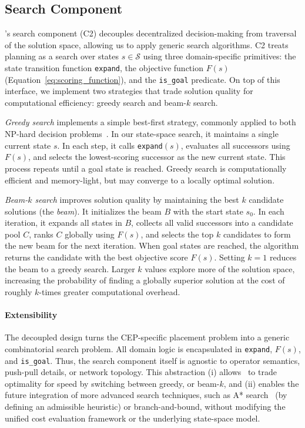 \subsection{Search Component}\label{sec:search}
%
\we's search component (C2) decouples decentralized decision-making from traversal of the solution space, allowing us to apply generic search algorithms.
%
C2 treats planning as a search over states $s \in \mathcal{S}$ using three domain-specific primitives: the state transition function \texttt{expand}, the objective function $F(s)$ (Equation~\ref{eq:scoring_function}), and the \texttt{is\_goal} predicate.
%
On top of this interface, we implement two strategies that trade solution quality for computational efficiency: greedy search and beam-$k$ search.

\textit{Greedy search}
%
implements a simple best-first strategy, commonly applied to both NP-hard decision problems~\cite{PushPullSamira,DBLP:journals/pacmmod/AkiliP023}.
%
In our state-space search, it maintains a single current state $s$.
%
In each step, it calls \texttt{expand}$(s)$, evaluates all successors using $F(s)$, and selects the lowest-scoring successor as the new current state.
%
This process repeats until a goal state is reached.
%
Greedy search is computationally efficient and memory-light, but may converge to a locally optimal solution.

\textit{Beam-$k$ search} improves solution quality by maintaining the best $k$ candidate solutions (the \emph{beam}). It initializes the beam $B$ with the start state $s_0$.
%
In each iteration, it expands all states in $B$, collects all valid successors into a candidate pool $C$, ranks $C$ globally using $F(s)$, and selects the top $k$ candidates to form the new beam for the next iteration.
%
When goal states are reached, the algorithm returns the candidate with the best objective score $F(s)$.
%
Setting $k=1$ reduces the beam to a greedy search.
%
Larger $k$ values explore more of the solution space, increasing the probability of finding a globally superior solution at the cost of roughly $k$-times greater computational overhead.

\paragraph{Extensibility}
The decoupled design turns the CEP-specific placement problem into a generic combinatorial search problem.
%
All domain logic is encapsulated in \texttt{expand}, $F(s)$, and \texttt{is\_goal}. Thus, the search component itself is agnostic to operator semantics, push-pull details, or network topology.
%
This abstraction (i) allows \we~to trade optimality for speed by switching between greedy, or beam-$k$, and (ii) enables the future integration of more advanced search techniques, such as A* search~\cite{DBLP:journals/pvldb/NtouniBG25} (by defining an admissible heuristic) or branch-and-bound, without modifying the unified cost evaluation framework or the underlying state-space model.
